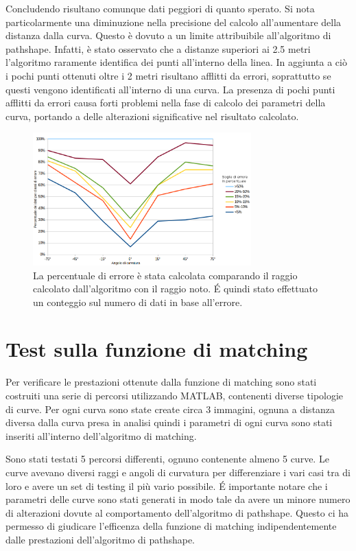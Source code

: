     Concludendo risultano comunque dati peggiori di quanto sperato. Si nota particolarmente una diminuzione nella precisione del calcolo all'aumentare della distanza dalla curva. Questo è dovuto a un limite attribuibile all'algoritmo di pathshape. Infatti, è stato osservato che a distanze superiori ai 2.5 metri l'algoritmo raramente identifica dei punti all'interno della linea. In aggiunta a ciò i pochi punti ottenuti oltre i 2 metri risultano afflitti da errori, soprattutto se questi vengono identificati all'interno di una curva. La presenza di pochi punti afflitti da errori causa forti problemi nella fase di calcolo dei parametri della curva, portando a delle alterazioni significative nel risultato calcolato.

    \begin{figure}[!ht]
        \centering
        \includegraphics[width=0.75\textwidth]{img/graphangle}
        \caption[Grafico sulla percentuale di errore in relazione all'angolo di curvatura]{La percentuale di errore è stata calcolata comparando il raggio calcolato dall'algoritmo con il raggio noto. \'E quindi stato effettuato un conteggio sul numero di dati in base all'errore.}
    \end{figure}

\section{Test sulla funzione di matching}

    Per verificare le prestazioni ottenute dalla funzione di matching sono stati costruiti una serie di percorsi utilizzando MATLAB, contenenti diverse tipologie di curve. Per ogni curva sono state create circa 3 immagini, ognuna a distanza diversa dalla curva presa in analisi quindi i parametri di ogni curva sono stati inseriti all'interno dell'algoritmo di matching.

    Sono stati testati 5 percorsi differenti, ognuno contenente almeno 5 curve. Le curve avevano diversi raggi e angoli di curvatura per differenziare i vari casi tra di loro e avere un set di testing il più vario possibile.
    \'E importante notare che i parametri delle curve sono stati generati in modo tale da avere un minore numero di alterazioni dovute al comportamento dell'algoritmo di pathshape. Questo ci ha permesso di giudicare l'efficenza della funzione di matching indipendentemente dalle prestazioni dell'algoritmo di pathshape.

